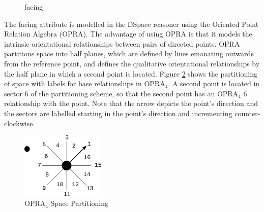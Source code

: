\documentclass[12pt]{ucthesis}
\begin{document}
\begin{figure}[H]
 \centering
 \hspace{10 mm}
  \hspace{10 mm}
 \hspace{10 mm}
 \caption{facing}
\label{display-arrangement}
\end{figure}

The facing attribute is modelled in the DSpace reasoner using the Oriented Point Relation Algebra \cite{Moratz} (OPRA). The advantage of using OPRA is that it models the intrinsic orientational relationships between pairs of directed points. OPRA partitions space into half planes, which are defined by lines emanating outwards from the reference point, and defines the qualitative orientational relationships by the half plane in which a second point is located. Figure \ref{facing-opra-base-rel} shows the partitioning of space with labels for base relationships in OPRA$_{4}$. A second point is located in sector 6 of the partitioning scheme, so that the second point has an OPRA$_{4}$ 6 relationship with the point. Note that the arrow depicts the point's direction and the sectors are labelled starting in the point's direction and incrementing counter-clockwise. 

\begin{figure}[H]
\centering
\includegraphics[width=40mm]{facing-opra-base-rel}
\caption{OPRA$_{4}$ Space Partitioning}
\label{facing-opra-base-rel}
\end{figure}
\end{document}
